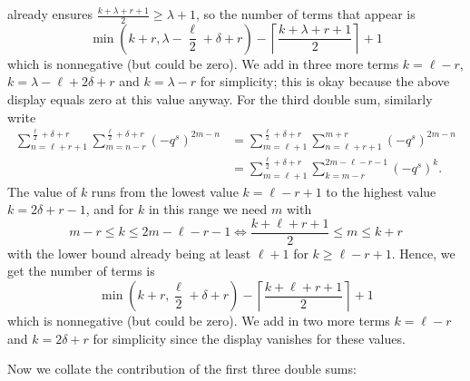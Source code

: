 \begin{itemize}
  already ensures $\frac{k + \lambda + r + 1}{2} \ge \lambda + 1$,
  so the number of terms that appear is
  \[ \min\left(k+r, \lambda - \frac{\ell}{2} + \delta + r \right)
    - \left\lceil \frac{k+\lambda+r+1}{2} \right\rceil + 1 \]
  which is nonnegative (but could be zero).
  We add in three more terms $k = \ell - r$,
  $k = \lambda - \ell + 2 \delta + r$ and $k = \lambda - r$
  for simplicity; this is okay because the above display equals zero at this value anyway.
  \ii For the third double sum, similarly write
  \begin{align*}
    \sum_{n=\ell+r+1}^{\frac{\ell}{2}+\delta+r}
      \sum_{m=n-r}^{\frac{\ell}{2}+\delta+r} (-q^s)^{2m-n}
    &=\sum_{m=\ell+1}^{\frac{\ell}{2}+\delta+r}
      \sum_{n=\ell+r+1}^{m+r} (-q^s)^{2m-n} \\
    &=\sum_{m=\ell+1}^{\frac{\ell}{2}+\delta+r}
      \sum_{k=m-r}^{2m-\ell-r-1} (-q^s)^k.
  \end{align*}
  The value of $k$ runs from the lowest value $k = \ell-r+1$
  to the highest value $k = 2\delta+r-1$, and for $k$ in this range we need $m$ with
  \[ m - r \le k \le 2 m - \ell - r - 1 \iff
    \frac{k + \ell + r + 1}{2} \le m \le k + r \]
  with the lower bound already being at least $\ell+1$ for $k \ge \ell-r+1$.
  Hence, we get the number of terms is
  \[ \min\left( k+r, \frac{\ell}{2} + \delta + r \right)
    - \left\lceil \frac{k+\ell+r+1}{2} \right\rceil + 1 \]
  which is nonnegative (but could be zero).
  We add in two more terms $k = \ell - r$ and $k = 2\delta + r$ for simplicity
  since the display vanishes for these values.
\end{itemize}
Now we collate the contribution of the first three double sums:

